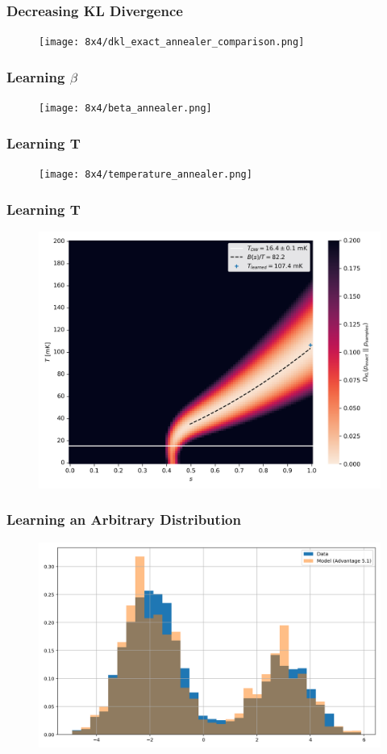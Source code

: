 \documentclass{beamer}
\begin{document}
\begin{frame}
    \frametitle{Decreasing KL Divergence}
    \begin{figure}
        \texttt{[image: 8x4/dkl\_exact\_annealer\_comparison.png]}
    \end{figure}
\end{frame}
\begin{frame}
    \frametitle{Learning \( \beta \)}
    \begin{figure}
        \texttt{[image: 8x4/beta\_annealer.png]}
    \end{figure}
\end{frame}
\begin{frame}
    \frametitle{Learning T}
    \begin{figure}
        \texttt{[image: 8x4/temperature\_annealer.png]}
    \end{figure}
\end{frame}
\begin{frame}
    \frametitle{Learning T}
    \begin{figure}
        \includegraphics[width=0.85\linewidth]{8x4/effective_temperature.png}
    \end{figure}
\end{frame}
\begin{frame}
    \frametitle{Learning an Arbitrary Distribution}
    \begin{figure}
        \includegraphics[width=1\linewidth]{8x4/hist_comparison_annealer.png}
    \end{figure}
\end{frame}
\end{document}
